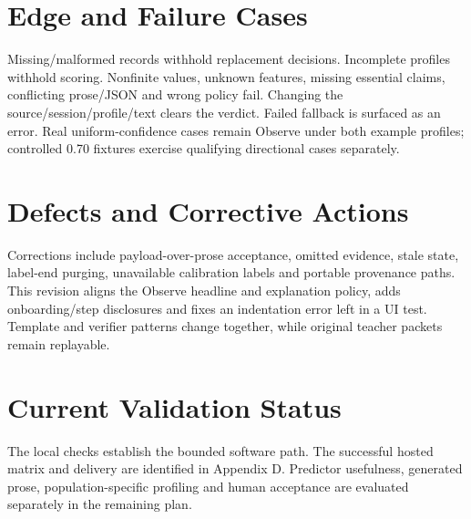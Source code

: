\section{Edge and Failure Cases}
Missing/malformed records withhold replacement decisions. Incomplete profiles withhold scoring. Nonfinite values, unknown features, missing essential claims, conflicting prose/JSON and wrong policy fail. Changing the source/session/profile/text clears the verdict. Failed fallback is surfaced as an error. Real uniform-confidence cases remain Observe under both example profiles; controlled 0.70 fixtures exercise qualifying directional cases separately.
\section{Defects and Corrective Actions}
Corrections include payload-over-prose acceptance, omitted evidence, stale state, label-end purging, unavailable calibration labels and portable provenance paths. This revision aligns the Observe headline and explanation policy, adds onboarding/step disclosures and fixes an indentation error left in a UI test. Template and verifier patterns change together, while original teacher packets remain replayable.
\section{Current Validation Status}
The local checks establish the bounded software path. The successful hosted matrix and delivery are identified in Appendix D. Predictor usefulness, generated prose, population-specific profiling and human acceptance are evaluated separately in the remaining plan.
